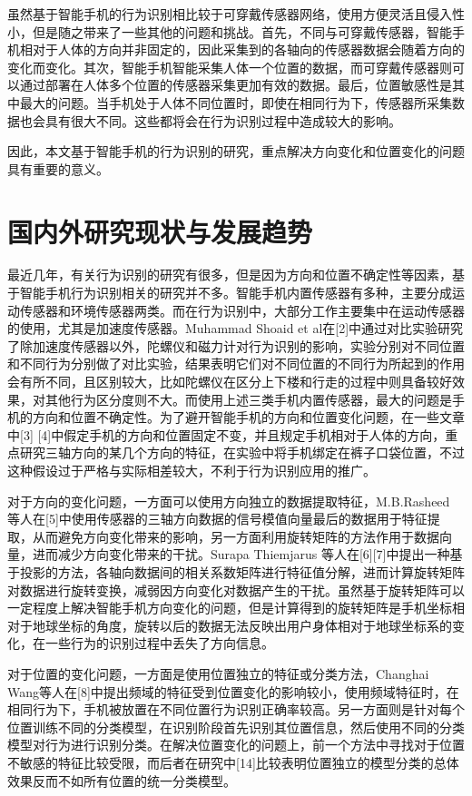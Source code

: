 \par 虽然基于智能手机的行为识别相比较于可穿戴传感器网络，使用方便灵活且侵入性小，但是随之带来了一些其他的问题和挑战。首先，不同与可穿戴传感器，智能手机相对于人体的方向并非固定的，因此采集到的各轴向的传感器数据会随着方向的变化而变化。其次，智能手机智能采集人体一个位置的数据，而可穿戴传感器则可以通过部署在人体多个位置的传感器采集更加有效的数据。最后，位置敏感性是其中最大的问题。当手机处于人体不同位置时，即使在相同行为下，传感器所采集数据也会具有很大不同。这些都将会在行为识别过程中造成较大的影响。
\par 因此，本文基于智能手机的行为识别的研究，重点解决方向变化和位置变化的问题具有重要的意义。
\section{国内外研究现状与发展趋势}
\par 最近几年，有关行为识别的研究有很多，但是因为方向和位置不确定性等因素，基于智能手机行为识别相关的研究并不多。智能手机内置传感器有多种，主要分成运动传感器和环境传感器两类。而在行为识别中，大部分工作主要集中在运动传感器的使用，尤其是加速度传感器。Muhammad Shoaid et al在[2]中通过对比实验研究了除加速度传感器以外，陀螺仪和磁力计对行为识别的影响，实验分别对不同位置和不同行为分别做了对比实验，结果表明它们对不同位置的不同行为所起到的作用会有所不同，且区别较大，比如陀螺仪在区分上下楼和行走的过程中则具备较好效果，对其他行为区分度则不大。而使用上述三类手机内置传感器，最大的问题是手机的方向和位置不确定性。为了避开智能手机的方向和位置变化问题，在一些文章中[3] [4]中假定手机的方向和位置固定不变，并且规定手机相对于人体的方向，重点研究三轴方向的某几个方向的特征，在实验中将手机绑定在裤子口袋位置，不过这种假设过于严格与实际相差较大，不利于行为识别应用的推广。
\par 对于方向的变化问题，一方面可以使用方向独立的数据提取特征，M.B.Rasheed 等人在[5]中使用传感器的三轴方向数据的信号模值向量最后的数据用于特征提取，从而避免方向变化带来的影响，另一方面利用旋转矩阵的方法作用于数据向量，进而减少方向变化带来的干扰。Surapa Thiemjarus 等人在[6][7]中提出一种基于投影的方法，各轴向数据间的相关系数矩阵进行特征值分解，进而计算旋转矩阵对数据进行旋转变换，减弱因方向变化对数据产生的干扰。虽然基于旋转矩阵可以一定程度上解决智能手机方向变化的问题，但是计算得到的旋转矩阵是手机坐标相对于地球坐标的角度，旋转以后的数据无法反映出用户身体相对于地球坐标系的变化，在一些行为的识别过程中丢失了方向信息。
\par 对于位置的变化问题，一方面是使用位置独立的特征或分类方法，Changhai Wang等人在[8]中提出频域的特征受到位置变化的影响较小，使用频域特征时，在相同行为下，手机被放置在不同位置行为识别正确率较高。另一方面则是针对每个位置训练不同的分类模型，在识别阶段首先识别其位置信息，然后使用不同的分类模型对行为进行识别分类。在解决位置变化的问题上，前一个方法中寻找对于位置不敏感的特征比较受限，而后者在研究中[14]比较表明位置独立的模型分类的总体效果反而不如所有位置的统一分类模型。
